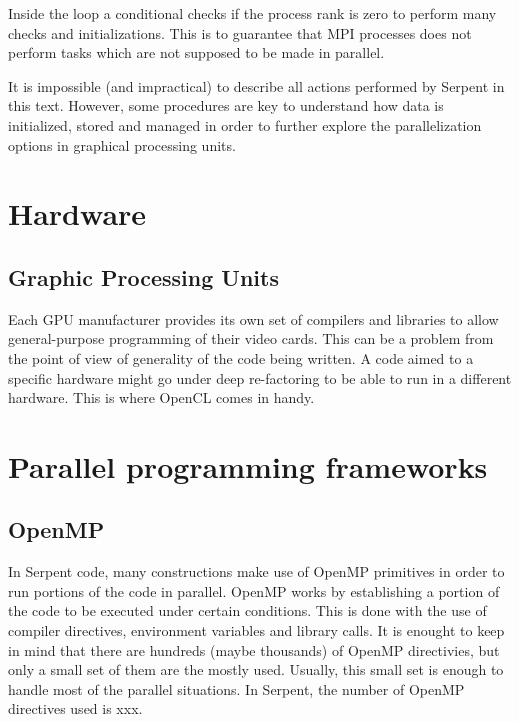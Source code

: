 \documentclass[twoside,a4paper,12pt,english]{anstrans}
\begin{document}
Inside the loop a conditional checks if the process rank is zero to perform many checks and initializations.
This is to guarantee that MPI processes does not perform tasks which are not supposed to be made in parallel.

It is impossible (and impractical) to describe all actions performed by Serpent in this text. However, some
procedures are key to understand how data is initialized, stored and managed in order to further explore
the parallelization options in graphical processing units.

\section{Hardware}

\subsection{Graphic Processing Units}

Each GPU manufacturer provides its own set of compilers and libraries to allow general-purpose
programming of their video cards. This can be a problem from the point of view of generality of
the code being written. A code aimed to a specific hardware might go under deep re-factoring to
be able to run in a different hardware. This is where OpenCL comes in handy.

\section{Parallel programming frameworks}

\subsection{OpenMP}
In Serpent code, many constructions make use of OpenMP primitives in order to run portions of the code in parallel.
OpenMP works by establishing a portion
of the code to be executed under certain conditions. This is done with the use of compiler directives,
environment variables and library calls. It is enought to keep in mind that there are hundreds (maybe thousands)
of OpenMP directivies, but only a small set of them are the mostly used. Usually, this small set is enough
to handle most of the parallel situations. In Serpent, the number of OpenMP directives used is xxx.
\end{document}
